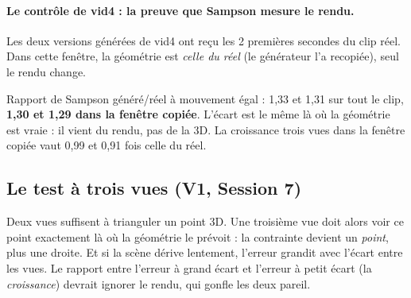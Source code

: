 \documentclass[11pt,a4paper]{article}
\begin{document}
\paragraph{Le contrôle de vid4 : la preuve que Sampson mesure le rendu.} Les deux versions générées de
vid4 ont reçu les 2 premières secondes du clip réel. Dans cette fenêtre, la géométrie est \emph{celle
du réel} (le générateur l'a recopiée), seul le rendu change.
\begin{resultat}
Rapport de Sampson généré/réel à mouvement égal : 1,33 et 1,31 sur tout le clip, \textbf{1,30 et 1,29
dans la fenêtre copiée}. L'écart est le même là où la géométrie est vraie : il vient du rendu, pas de
la 3D. La croissance trois vues dans la fenêtre copiée vaut 0,99 et 0,91 fois celle du réel.
\end{resultat}

\subsection{Le test à trois vues (V1, Session 7)}

\begin{intuition}
Deux vues suffisent à trianguler un point 3D. Une troisième vue doit alors voir ce point exactement
là où la géométrie le prévoit : la contrainte devient un \emph{point}, plus une droite. Et si la scène
dérive lentement, l'erreur grandit avec l'écart entre les vues. Le rapport entre l'erreur à grand écart
et l'erreur à petit écart (la \emph{croissance}) devrait ignorer le rendu, qui gonfle les deux pareil.
\end{intuition}
\end{document}
